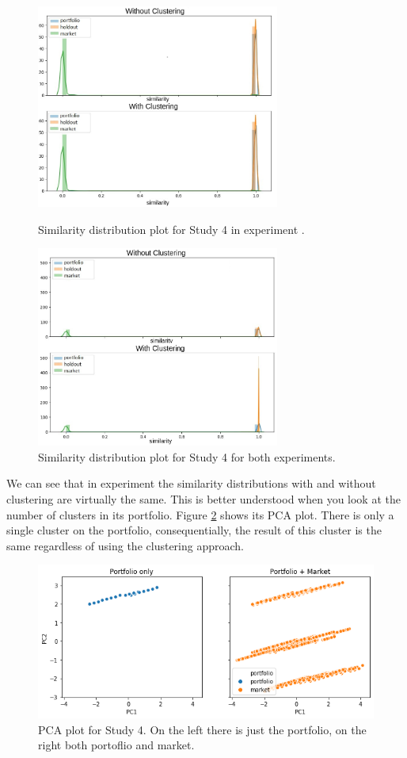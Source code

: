 \begin{figure}[!ht]
   \centering
   
   \includegraphics[width=8cm]{fig/ch4-study-4-comparsion-exp-i.png}
   \caption{Similarity distribution plot for Study 4 in experiment \nameExperimentI{}.}
   \label{fig:study-4-comparsion-exp-i}

   \includegraphics[width=8cm]{fig/ch4-study-4-comparsion-exp-ii.png}
   \caption{Similarity distribution plot for Study 4 for both experiments.}
   \label{fig:study-4-comparsion-exp-ii}
\end{figure}

We can see that in experiment \nameExperimentI{} the similarity distributions with and without clustering are virtually the same. This is better understood when you look at the number of clusters in its portfolio. Figure \ref{fig:study-4-pca-plot} shows its PCA plot. There is only a single cluster on the portfolio, consequentially, the result of this cluster is the same regardless of using the clustering approach.

\begin{figure}[!ht]
   \centering
   \includegraphics[width=\linewidth]{fig/ch4-study-4-pca-plot.png}
   \caption{PCA plot for Study 4. On the left there is just the portfolio, on the right both portoflio and market.}
   \label{fig:study-4-pca-plot}
\end{figure}

